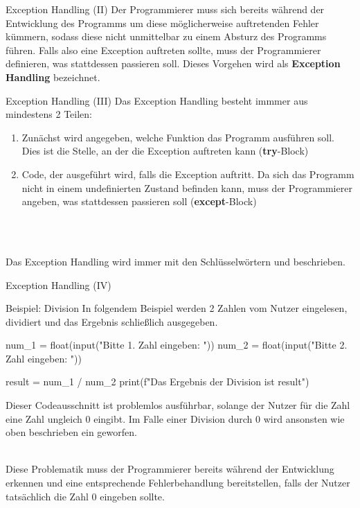     \begin{frame}[fragile]{Exception Handling (II)}
        Der Programmierer muss sich bereits während der Entwicklung des Programms um diese möglicherweise auftretenden Fehler kümmern, sodass diese nicht unmittelbar zu einem Absturz des Programms führen. Falls also eine Exception auftreten sollte, muss der Programmierer definieren, was stattdessen passieren soll. Dieses Vorgehen wird als \textbf{Exception Handling} bezeichnet.
    \end{frame}
    
    \begin{frame}[fragile]{Exception Handling (III)}
        Das Exception Handling besteht immmer aus mindestens 2 Teilen:
        \begin{enumerate}
            \item Zunächst wird angegeben, welche Funktion das Programm ausführen soll. Dies ist die Stelle, an der die Exception auftreten kann (\textbf{try}-Block)
            \item Code, der ausgeführt wird, falls die Exception auftritt. Da sich das Programm nicht in einem undefinierten Zustand befinden kann, muss der Programmierer angeben, was stattdessen passieren soll (\textbf{except}-Block)
        \end{enumerate}\\~\
        
        Das Exception Handling wird immer mit den Schlüsselwörtern  und  beschrieben.
    \end{frame}
    
    \begin{frame}[fragile]{Exception Handling (IV)}

    
\begin{exampleblock}{Beispiel: Division}
In folgendem Beispiel werden 2 Zahlen vom Nutzer eingelesen, dividiert und das Ergebnis schließlich ausgegeben.

\begin{pythoncode}
num_1 = float(input("Bitte 1. Zahl eingeben: "))
num_2 = float(input("Bitte 2. Zahl eingeben: "))

result = num_1 / num_2
print(f"Das Ergebnis der Division ist {result}")
\end{pythoncode}

Dieser Codeausschnitt ist problemlos ausführbar, solange der Nutzer für die Zahl  eine Zahl ungleich 0 eingibt. Im Falle einer Division durch 0 wird ansonsten wie oben beschrieben ein  geworfen.\\~\

Diese Problematik muss der Programmierer bereits während der Entwicklung erkennen und eine entsprechende Fehlerbehandlung bereitstellen, falls der Nutzer tatsächlich die Zahl 0 eingeben sollte.
\end{exampleblock}    

    \end{frame}
    
